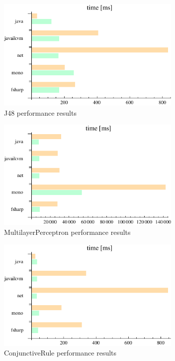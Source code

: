 \documentclass[journal]{IEEEtran/IEEEtran}
\begin{document}
\begin{figure}[H]
\centering
\includegraphics[width=3.5in]{J48}
\caption{J48 performance results}
\end{figure}
\begin{figure}[H]
\centering
\includegraphics[width=3.5in]{MultilayerPerceptron}
\caption{MultilayerPerceptron performance results}
\end{figure}
\begin{figure}[H]
\centering
\includegraphics[width=3.5in]{ConjunctiveRule}
\caption{ConjunctiveRule performance results}
\end{figure}


\end{document}
